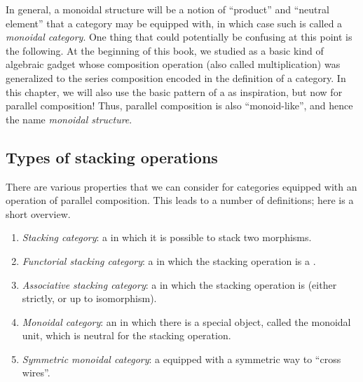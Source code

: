 
In general, a monoidal structure will be a notion of ``product'' and ``neutral element'' that a category may be equipped with, in which case such is called a \emph{monoidal category}.
One thing that could potentially be confusing at this point is the following.
At the beginning of this book, we studied  as a basic kind of algebraic gadget whose composition operation (also called multiplication) was generalized to the series composition encoded in the definition of a category.
In this chapter, we will also use the basic pattern of a  as inspiration, but now for parallel composition!
Thus, parallel composition is also ``monoid-like'', and hence the name \emph{monoidal structure}.

\subsection{Types of stacking operations}

There are various properties that we can consider for categories equipped with an operation of parallel composition.
This leads to a number of definitions; here is a short overview.
%
\begin{enumerate}
    \item \emph{Stacking category}: a  in which it is possible to stack two morphisms.
    \item \emph{Functorial stacking category}: a  in which the stacking operation is a .
    \item \emph{Associative stacking category}: a  in which the stacking operation is  (either strictly, or up to isomorphism).
    \item \emph{Monoidal category}: an  in which there is a special object, called the monoidal unit, which is neutral for the stacking operation.
    \item \emph{Symmetric monoidal category}: a  equipped with a symmetric way to ``cross wires''.
\end{enumerate}

